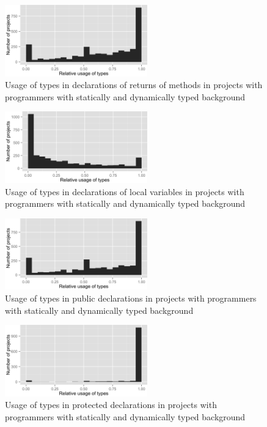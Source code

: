\begin{figure}[h]
\centering 
\includegraphics[width=0.55\textwidth]{../aosd_2014/analysis/result/background/static-and-dynamic/histograms/7_Method_Return.png} 
\caption{Usage of types in declarations of returns of methods in projects with programmers with statically and dynamically typed background}
\end{figure}

\begin{figure}[h]
\centering 
\includegraphics[width=0.55\textwidth]{../aosd_2014/analysis/result/background/static-and-dynamic/histograms/6_Local_Variable.png} 
\caption{Usage of types in declarations of local variables in projects with programmers with statically and dynamically typed background}
\end{figure}

\begin{figure}[h]
\centering 
\includegraphics[width=0.55\textwidth]{../aosd_2014/analysis/result/background/static-and-dynamic/histograms/13_Public.png} 
\caption{Usage of types in public declarations in projects with programmers with statically and dynamically typed background}
\end{figure}

\begin{figure}[h]
\centering 
\includegraphics[width=0.55\textwidth]{../aosd_2014/analysis/result/background/static-and-dynamic/histograms/12_Protected.png} 
\caption{Usage of types in protected declarations in projects with programmers with statically and dynamically typed background}
\end{figure}

